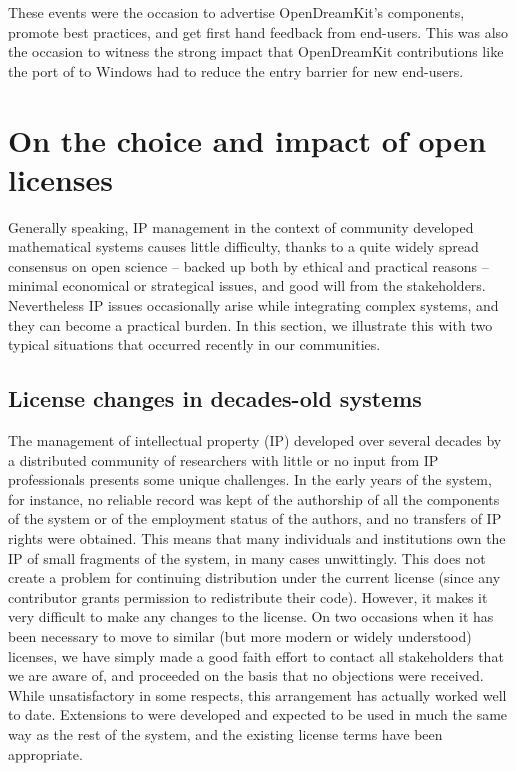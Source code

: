 \documentclass{deliverablereport}
\begin{document}
These events were the occasion to advertise OpenDreamKit's components,
promote best practices, and get first hand feedback from end-users.
This was also the occasion to witness the strong impact that
OpenDreamKit contributions like the port of \Sage to Windows had to
reduce the entry barrier for new end-users.

\section{On the choice and impact of open licenses}

Generally speaking, IP management in the context of community
developed mathematical systems causes little difficulty, thanks to a
quite widely spread consensus on open science -- backed up both by
ethical and practical reasons -- minimal economical or strategical
issues, and good will from the stakeholders. Nevertheless IP issues
occasionally arise while integrating complex systems, and they can
become a practical burden. In this section, we illustrate this with
two typical situations that occurred recently in our communities.

\subsection{License changes in decades-old systems}

The management of intellectual property (IP) developed over several
decades by a distributed community of researchers with
little or no input from IP professionals
presents some unique challenges. In the early years of the \GAP
system, for instance, no reliable record was kept of the authorship of
all the components of the system or of the employment status of the
authors, and no transfers of IP rights were obtained. This means that
many individuals and institutions own the IP of small
fragments of the system, in many cases unwittingly.
This does not create a problem for continuing
distribution under the current license (since any contributor
grants permission to redistribute their code).
However, it makes it very difficult to make any changes to the
license. On two occasions when it has been necessary to move to
similar (but more modern or widely understood) licenses, we have simply
made a good faith effort to contact all stakeholders that we are aware
of, and proceeded on the basis that no objections were received.
While unsatisfactory in some respects, this arrangement has actually
worked well to date.
Extensions to \GAP were developed and expected to be used
in much the same way as the rest of the system, and the existing
license terms have been appropriate.
\end{document}
